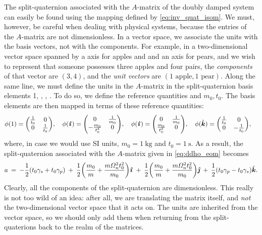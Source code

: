 The split-quaternion associated with the $A$-matrix of the doubly damped system can easily be found using the mapping defined by \cref{eq:inv_quat_isom}. We must, however, be careful when dealing with physical systems, because the entries of the $A$-matrix are not dimensionless. In a vector space, we associate the units with the basis vectors, not with the components. For example, in a two-dimensional vector space spanned by a axis for apples and and an axis for pears, and we wish to represent that someone possesses three apples and four pairs, the \emph{components} of that vector are $(3, 4)$, and the \emph{unit vectors} are $(1 \text{ apple}, 1\text{ pear})$. Along the same line, we must define the units in the $A$-matrix in the split-quaternion basis elements 1, \quati, \quatj, \quatk. To do so, we define the reference quantities and $m_0, t_0$. The basis elements are then mapped in terms of these reference quantities:
$$ 
    \phi(1) = \mqty(\tfrac{1}{t_0} & 0 \\ 0 & \tfrac{1}{t_0}), \quad 
    \phi(\quati) = \mqty(0 & \tfrac{1}{m_0} \\  -\tfrac{m_0}{t_0^2} & 0), \quad
    \phi(\quati) = \mqty(0 & \tfrac{1}{m_0} \\  \tfrac{m_0}{t_0^2} & 0), \quad
    \phi(\quatk) = \mqty(\tfrac{1}{t_0} & 0 \\ 0 & -\tfrac{1}{t_0}), \quad 
$$
where, in case we would use SI units, $m_0 = \SI{1}{\kilogram}$ and $t_0 = \SI{1}{\second}$. As a result, the split-quaternion associated with the $A$-matrix given in \cref{eq:ddho_eom} becomes
\begin{equation}
    a\:=\: -\frac{1}{2}\qty(t_0\gamma_s + t_0\gamma_p)\:+\:\frac{1}{2}\qty(\frac{m_0}{m} + \frac{m\Omega_n^2 t_0^2}{m_0})\quati\:+\:\frac{1}{2}\qty(\frac{m_0}{m} + \frac{m\Omega_n^2 t_0^2}{m_0})\quatj\:+\:\frac{1}{2}\qty(t_0\gamma_p - t_0\gamma_s)\quatk. 
    \label{eq:ddho_quat_units}
\end{equation}
Clearly, all the components of the split-quaternion are dimensionless. This really is not too wild of an idea: after all, we are translating the matrix itself, and \emph{not} the two-dimensional vector space that it acts on. The units are inherited from the vector space, so we should only add them when returning from the split-quaterions back to the realm of the matrices. 

